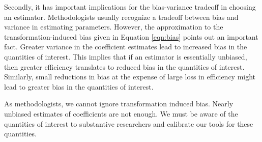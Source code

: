 \documentclass[12pt]{article}
\begin{document}
Secondly, it has important implications for the bias-variance tradeoff in choosing an estimator. 
Methodologists usually recognize a tradeoff between bias and variance in estimating parameters. 
However, the approximation to the transformation-induced bias given in Equation \ref{eqn:bias} points out an important fact. 
Greater variance in the coefficient estimates lead to increased bias in the quantities of interest. 
This implies that if an estimator is essentially unbiased, then greater efficiency translates to reduced bias in the quantities of interest. 
Similarly, small reductions in bias at the expense of large loss in efficiency might lead to greater bias in the quantities of interest. 

As methodologists, we cannot ignore transformation induced bias. Nearly unbiased estimates of coefficients are not enough. We must be aware of the quantities of interest to substantive researchers and calibrate our tools for these quantities.

\singlespace 
\small


\end{document}
